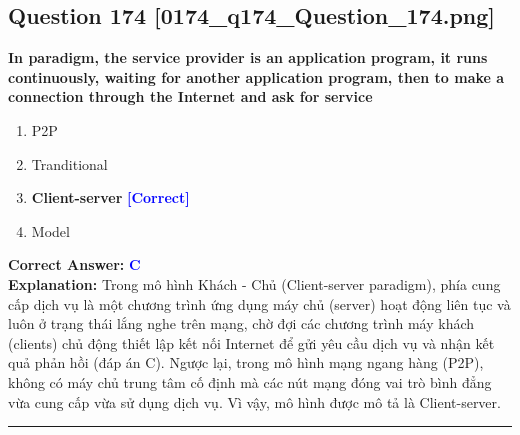 \documentclass[11pt,a4paper]{article}
\begin{document}
\begin{minipage}{\textwidth}
\subsection*{Question 174 \quad \footnotesize{[0174\_q174\_Question\_174.png]}}
\noindent \textbf{In paradigm, the service provider is an application program, it runs continuously, waiting for another application program, then to make a connection through the Internet and ask for service}

\begin{enumerate}[label=\Alph*.]
    \item P2P
    \item Tranditional
    \item \textbf{Client-server} \hfill \textcolor{blue}{\textbf{[Correct]}}
    \item Model
\end{enumerate}

\noindent \textbf{Correct Answer:} \textcolor{blue}{\textbf{C}} \\[2pt]
\noindent \textbf{Explanation:} Trong mô hình Khách - Chủ (Client-server paradigm), phía cung cấp dịch vụ là một chương trình ứng dụng máy chủ (server) hoạt động liên tục và luôn ở trạng thái lắng nghe trên mạng, chờ đợi các chương trình máy khách (clients) chủ động thiết lập kết nối Internet để gửi yêu cầu dịch vụ và nhận kết quả phản hồi (đáp án C). Ngược lại, trong mô hình mạng ngang hàng (P2P), không có máy chủ trung tâm cố định mà các nút mạng đóng vai trò bình đẳng vừa cung cấp vừa sử dụng dịch vụ. Vì vậy, mô hình được mô tả là Client-server.

\par\vspace{0.3cm}
\hrule
\vspace{0.3cm}
\end{minipage}
\end{document}
